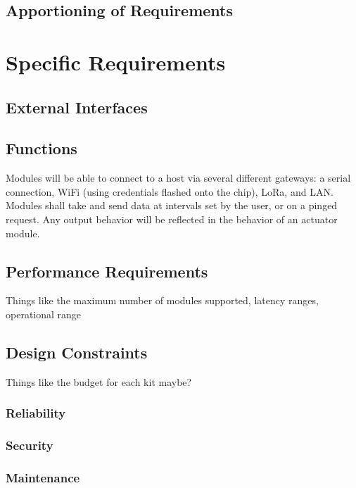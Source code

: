 \documentclass[onecolumn, draftclsnofoot,10pt, compsoc]{IEEEtran}
\begin{document}
	\subsection{Apportioning of Requirements}

\section{Specific Requirements}
\subsection{External Interfaces}
\subsection{Functions}
Modules will be able to connect to a host via several different gateways: a serial connection, WiFi (using credentials flashed onto the chip), LoRa, and LAN. Modules shall take and send data at intervals set by the user, or on a pinged request. Any output behavior will be reflected in the behavior of an actuator module.

\subsection{Performance Requirements}
Things like the maximum number of modules supported, latency ranges, operational range

\subsection{Design Constraints}
Things like the budget for each kit maybe?

\subsubsection{Reliability}
\subsubsection{Security}
\subsubsection{Maintenance}
\end{document}
